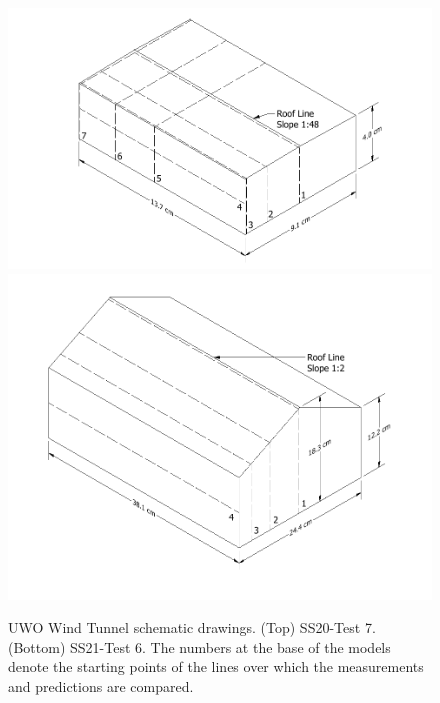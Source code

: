 \begin{figure}[!ht]
\centering
\includegraphics[width=5.5in]{FIGURES/UWO_Wind_Tunnel/UWO-BLT-SS20-Test7}
\includegraphics[width=5.5in]{FIGURES/UWO_Wind_Tunnel/UWO-BLWT-SS21-Test6-40ft}
\caption[UWO Wind Tunnel schematic drawings]{UWO Wind Tunnel schematic drawings. (Top) SS20-Test 7. (Bottom) SS21-Test 6. The numbers at the base of the models denote the starting points of the lines over which the measurements and predictions are compared.}
\label{UWO_Drawings}
\end{figure}

